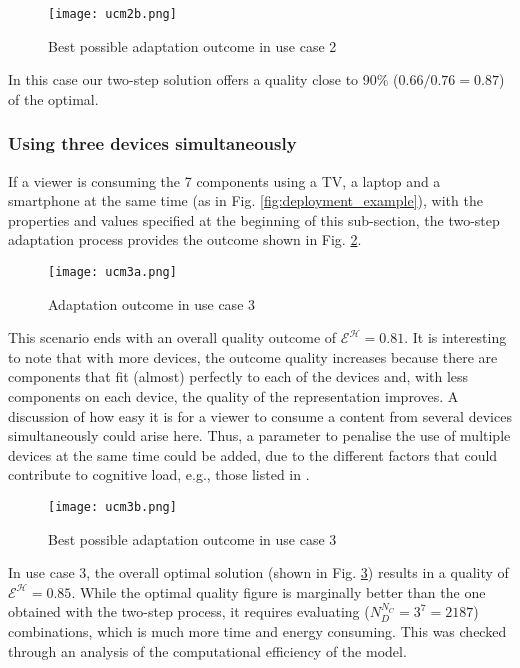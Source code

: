 \begin{figure}
	\begin{center}
		\texttt{[image: ucm2b.png]}
		\caption{Best possible adaptation outcome in use case 2}
		\label{fig:uc2b}
	\end{center}
\end{figure} 
In this case our two-step solution offers a quality close to 90\% ($0.66/0.76 = 0.87$) of the optimal. 

\subsubsection{Using three devices simultaneously}

If a viewer is consuming the 7 components using a TV, a laptop and a smartphone at the same time (as in Fig. \ref{fig:deployment_example}), with the properties and values specified at the beginning of this sub-section, the two-step adaptation process provides the outcome shown in Fig. \ref{fig:uc3a}.

\begin{figure}
	\begin{center}
		\texttt{[image: ucm3a.png]}
		\caption{Adaptation outcome in use case 3}
		\label{fig:uc3a}
	\end{center}
\end{figure} 

This scenario ends with an overall quality outcome of $\mathcal{E}^\mathcal{H} = 0.81$. 
It is interesting to note that with more devices, the outcome quality increases because there are components that fit (almost) perfectly to each of the devices and, with less components on each device, the quality of the representation improves. 
A discussion of how easy it is for a viewer to consume a content from several devices simultaneously could arise here. 
Thus, a parameter to penalise the use of multiple devices at the same time could be added, due to the different factors that could contribute to cognitive load, e.g., those listed in \cite{hart1988development}. 

\begin{figure}	
	\begin{center}
		\texttt{[image: ucm3b.png]}
		\caption{Best possible adaptation outcome in use case 3}
		\label{fig:uc3b}
	\end{center}
\end{figure}

In use case 3, the overall optimal solution (shown in Fig. \ref{fig:uc3b}) results in a quality of $\mathcal{E}^\mathcal{H} = 0.85$.
While the optimal quality figure is marginally better than the one obtained with the two-step process, it requires evaluating ($N^{N_C}_D = 3^7 = 2187$) combinations, which is much more time and energy consuming. This was checked through an analysis of the computational efficiency of the model. 


